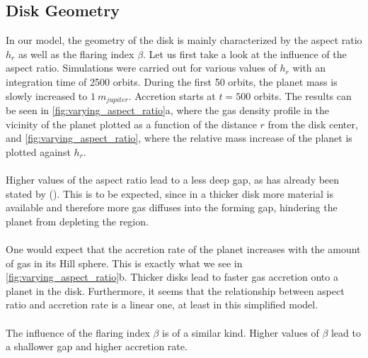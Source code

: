    \subsection{Disk Geometry}
      \label{sec:disk_geometry}
      In our model, the geometry of the disk is mainly characterized by the 
      aspect ratio $h_r$ as well as the flaring index $\beta$. Let us first 
      take a look at the influence of the aspect ratio. Simulations were 
      carried out for various values of $h_r$ with an integration time of 
      2500 orbits. During the first 50 orbits, the planet mass is slowly 
      increased to $1\ m_{jupiter}$. Accretion starts at $t=500$ orbits.
      The results can be seen in \autoref{fig:varying_aspect_ratio}a,
      where the gas density profile in the vicinity of the planet plotted
      as a function of the distance $r$ from the disk center, and 
      \autoref{fig:varying_aspect_ratio}, where the relative mass increase 
      of the planet is plotted against $h_r$. \\
      \\
      Higher values of the aspect ratio lead to a less deep gap, as has 
      already been stated by \citeauthor{Crida_2006} (\citeyear{Crida_2006}). 
      This is to be expected, since in a thicker disk more material is available 
      and therefore more gas diffuses into the forming gap, hindering the planet 
      from depleting the region. \\
      \\
      One would expect that the accretion rate of the planet increases with
      the amount of gas in its Hill sphere. This is exactly what we see in 
      \autoref{fig:varying_aspect_ratio}b. Thicker disks lead to faster 
      gas accretion onto a planet in the disk. Furthermore, it seems that the 
      relationship between aspect ratio and accretion rate is a linear one,
      at least in this simplified model. \\
      \\
      The influence of the flaring index $\beta$ is of a similar kind. Higher 
      values of $\beta$ lead to a shallower gap and higher accretion rate.
